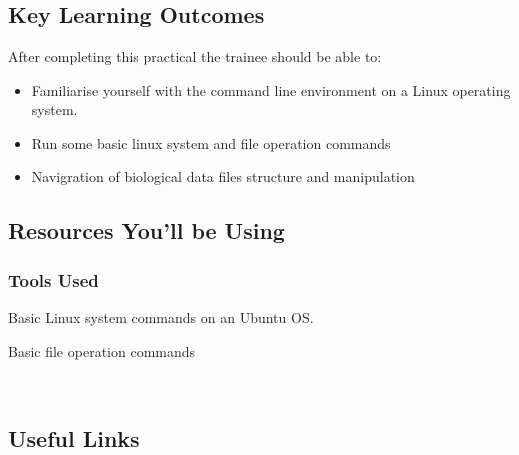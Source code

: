 




\chapter{\moduleTitle}
\newpage

\section{Key Learning Outcomes}

After completing this practical the trainee should be able to:
\begin{itemize}
  \item Familiarise yourself with the command line environment on a Linux operating system.
  \item Run some basic linux system and file operation commands
  \item Navigration of biological data files structure and manipulation
\end{itemize}

\section{Resources You'll be Using}
 
\subsection{Tools Used}
\begin{description}[style=multiline,labelindent=0cm,align=left,leftmargin=0.5cm]
  \item Basic Linux system commands on an Ubuntu OS.
 \item Basic file operation commands 
\end{description}\

\section{Useful Links}
 
